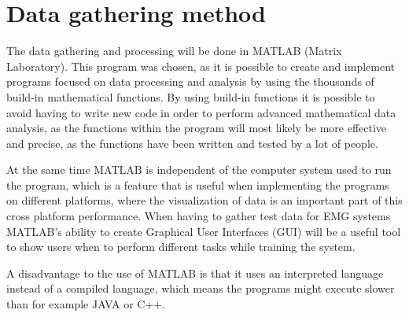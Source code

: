 \section{Data gathering method}

The data gathering and processing will be done in MATLAB (Matrix Laboratory). This program was chosen, as it is possible to create and implement programs focused on data processing and analysis by using the thousands of build-in mathematical functions. By using build-in functions it is possible to avoid having to write new code in order to perform advanced mathematical data analysis, as the functions within the program will most likely be more effective and precise, as the functions have been written and tested by a lot of people. \cite{chapman2013}

At the same time MATLAB is independent of the computer system used to run the program, which is a feature that is useful when implementing the programs on different platforms, where the visualization of data is an important part of this cross platform performance. When having to gather test data for EMG systems MATLAB's ability to create Graphical User Interfaces (GUI) will be a useful tool to show users when to perform different tasks while training the system. \cite{chapman2013}

A disadvantage to the use of MATLAB is that it uses an interpreted language instead of a compiled language, which means the programs might execute slower than for example JAVA or C++. \cite{chapman2013}


